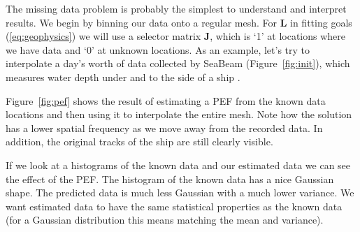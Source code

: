 
The missing data problem is probably the simplest to understand and
interpret results.  
We  begin by binning our data onto a regular mesh.
For $\mathbf{L}$ in fitting goals (\ref{eq:geophysics}) we will use a selector 
matrix $\mathbf{J}$,
which is `1' at locations where we have data and `0' at unknown locations.
As an  example, let's  try to interpolate 
a day's worth of  data
collected by SeaBeam (Figure~\ref{fig:init}), which measures
water depth under and to the side of a  ship \cite[]{gee}. 


Figure~\ref{fig:pef} shows the result of estimating a PEF from the
known data locations and then using it to interpolate the entire mesh.
Note how the solution has a lower spatial frequency as we move away from
the recorded data. In addition, the original tracks of the ship are still
clearly visible.  


\par
If we look at a histograms of the known data and our estimated data we
can see the effect of the PEF.  The histogram of the known data has a
nice Gaussian shape.  The predicted
data is much less Gaussian with a much lower variance.  We want estimated 
data to have the same statistical properties as the known data (for
a Gaussian distribution this means matching the mean and variance).


